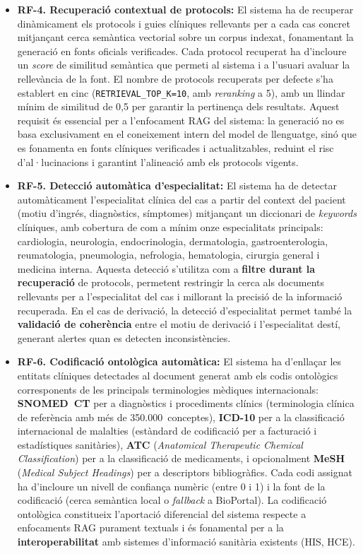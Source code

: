 \documentclass[CAT]{TFUOC}%
\begin{document}
\begin{itemize}
    \item \textbf{RF-4. Recuperació contextual de protocols:} El sistema ha de recuperar dinàmicament els protocols i guies clíniques rellevants per a cada cas concret mitjançant cerca semàntica vectorial sobre un corpus indexat, fonamentant la generació en fonts oficials verificades. Cada protocol recuperat ha d'incloure un \textit{score} de similitud semàntica que permeti al sistema i a l'usuari avaluar la rellevància de la font. El nombre de protocols recuperats per defecte s'ha establert en cinc (\texttt{RETRIEVAL\_TOP\_K=10}, amb \textit{reranking} a 5), amb un llindar mínim de similitud de 0,5 per garantir la pertinença dels resultats. Aquest requisit és essencial per a l'enfocament RAG del sistema: la generació no es basa exclusivament en el coneixement intern del model de llenguatge, sinó que es fonamenta en fonts clíniques verificades i actualitzables, reduint el risc d'al·lucinacions i garantint l'alineació amb els protocols vigents.

    \item \textbf{RF-5. Detecció automàtica d'especialitat:} El sistema ha de detectar automàticament l'especialitat clínica del cas a partir del context del pacient (motiu d'ingrés, diagnòstics, símptomes) mitjançant un diccionari de \textit{keywords} clíniques, amb cobertura de com a mínim onze especialitats principals: cardiologia, neurologia, endocrinologia, dermatologia, gastroenterologia, reumatologia, pneumologia, nefrologia, hematologia, cirurgia general i medicina interna. Aquesta detecció s'utilitza com a \textbf{filtre durant la recuperació} de protocols, permetent restringir la cerca als documents rellevants per a l'especialitat del cas i millorant la precisió de la informació recuperada. En el cas de derivació, la detecció d'especialitat permet també la \textbf{validació de coherència} entre el motiu de derivació i l'especialitat destí, generant alertes quan es detecten inconsistències.

    \item \textbf{RF-6. Codificació ontològica automàtica:} El sistema ha d'enllaçar les entitats clíniques detectades al document generat amb els codis ontològics corresponents de les principals terminologies mèdiques internacionals: \textbf{SNOMED~CT} per a diagnòstics i procediments clínics (terminologia clínica de referència amb més de 350.000~conceptes), \textbf{ICD-10} per a la classificació internacional de malalties (estàndard de codificació per a facturació i estadístiques sanitàries), \textbf{ATC} (\textit{Anatomical Therapeutic Chemical Classification}) per a la classificació de medicaments, i opcionalment \textbf{MeSH} (\textit{Medical Subject Headings}) per a descriptors bibliogràfics. Cada codi assignat ha d'incloure un nivell de confiança numèric (entre 0 i 1) i la font de la codificació (cerca semàntica local o \textit{fallback} a BioPortal). La codificació ontològica constitueix l'aportació diferencial del sistema respecte a enfocaments RAG purament textuals i és fonamental per a la \textbf{interoperabilitat} amb sistemes d'informació sanitària existents (HIS, HCE).


\end{itemize}
\end{document}
